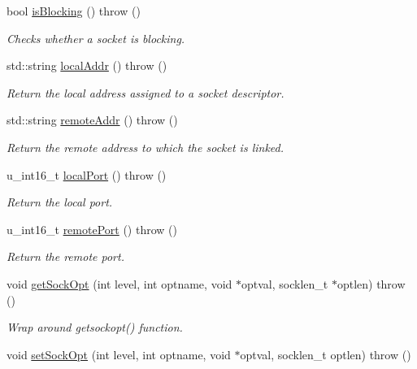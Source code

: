 \begin{CompactItemize}
bool \hyperlink{classusock_1_1BaseSocket_d29a1fabc8b4c7a86cd236473ef03177}{isBlocking} ()  throw ()
\begin{CompactList}\small\item\em Checks whether a socket is blocking. \item\end{CompactList}\item 
std::string \hyperlink{classusock_1_1BaseSocket_479da55516dcda8117a356d8a3be3d83}{localAddr} ()  throw ()
\begin{CompactList}\small\item\em Return the local address assigned to a socket descriptor. \item\end{CompactList}\item 
std::string \hyperlink{classusock_1_1BaseSocket_3842fc1ea6ac5575e988d4ee620089a7}{remoteAddr} ()  throw ()
\begin{CompactList}\small\item\em Return the remote address to which the socket is linked. \item\end{CompactList}\item 
u\_\-int16\_\-t \hyperlink{classusock_1_1BaseSocket_47218f0ff53693f2891573ec47d84f36}{localPort} ()  throw ()
\begin{CompactList}\small\item\em Return the local port. \item\end{CompactList}\item 
u\_\-int16\_\-t \hyperlink{classusock_1_1BaseSocket_e4e09d33779e097ada03144ff54286aa}{remotePort} ()  throw ()
\begin{CompactList}\small\item\em Return the remote port. \item\end{CompactList}\item 
void \hyperlink{classusock_1_1BaseSocket_87925e8c3b89a50f8c8c2a68e0d2ab70}{getSockOpt} (int level, int optname, void $\ast$optval, socklen\_\-t $\ast$optlen)  throw ()
\begin{CompactList}\small\item\em Wrap around getsockopt() function. \item\end{CompactList}\item 
void \hyperlink{classusock_1_1BaseSocket_d0444de98899e9312bfa320d5a359e07}{setSockOpt} (int level, int optname, void $\ast$optval, socklen\_\-t optlen)  throw ()

\end{CompactItemize}
